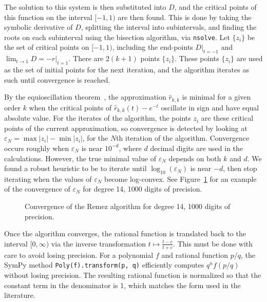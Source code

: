 \label{sec:nsolve-bisection}
The solution to this system is then substituted into $D$, and the critical
points of this function on the interval $[-1, 1)$ are then found. This is done
by taking the symbolic derivative of $D$, splitting the interval into
subintervals, and finding the roots on each subinterval using the bisection
algorithm, via \texttt{nsolve}. Let $\{z_i\}$ be the set of critical points on
$[-1, 1)$, including the end-points $D|_{t=-1}$ and
$\lim_{t\to 1} D=-r|_{t=1}$. There are $2(k+1)$ points $\{z_i\}$. These points
$\{z_i\}$ are used as the set of initial points for the next iteration, and
the algorithm iterates as such until convergence is reached.

By the equioscillation theorem~\cite{ationneeded}, the approximation
$\hat{r}_{k, k}$ is minimal for a given order $k$ when the critical points of
$\hat{r}_{k, k}(t) - e^{-t}$ oscillate in sign and have equal absolute value.
For the iterates of the algorithm, the points $z_i$ are these critical points
of the current approximation, so convergence is detected by looking at
$\varepsilon_N = \max{|z_i|} - \min{|z_i|}$, for the $N$th iteration of the
algorithm. Convergence occurs roughly when $\varepsilon_N$ is near $10^{-d}$,
where $d$ decimal digits are used in the calculations. However, the true
minimal value of $\varepsilon_N$ depends on both $k$ and $d$. We found a
robust heuristic to be to iterate until $\log_{10}{(\varepsilon_N)}$ is near
$-d$, then stop iterating when the values of $\varepsilon_N$ become
log-convex. See Figure~\ref{fig:convergence-14-1000} for an example of the
convergence of $\varepsilon_N$ for degree 14, 1000 digits of precision.

\begin{figure}[!ht]
\centering
\resizebox{0.9\textwidth}{!}{}
\caption{Convergence of the Remez algorithm for degree 14, 1000 digits of
  precision.}
\label{fig:convergence-14-1000}
\end{figure}

Once the algorithm converges, the rational function is translated back to the
interval $[0, \infty)$ via the inverse transformation
$t\mapsto \frac{t - c}{t + c}$. This must be done with care to avoid losing
precision. For a polynomial $f$ and rational function $p/q$, the SymPy method
\texttt{Poly(f).\allowbreak{}transform(p, q)} efficiently computes
$q^nf\left(p/q\right)$ without losing precision. The resulting rational
function is normalized so that the constant term in the denominator is 1,
which matches the form used in the literature.~\cite{ationneeded}

